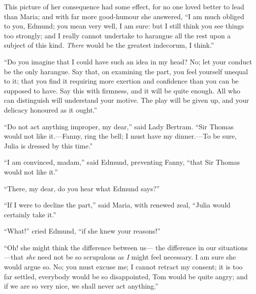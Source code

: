 This picture of her consequence had some effect, for no
one loved better to lead than Maria; and with far more
good-humour she answered, ``I am much obliged to you, Edmund;
you mean very well, I am sure:  but I still think you
see things too strongly; and I really cannot undertake
to harangue all the rest upon a subject of this kind.
\emph{There} would be the greatest indecorum, I think.''

``Do you imagine that I could have such an idea in
my head?  No; let your conduct be the only harangue.
Say that, on examining the part, you feel yourself
unequal to it; that you find it requiring more exertion
and confidence than you can be supposed to have.
Say this with firmness, and it will be quite enough.
All who can distinguish will understand your motive.
The play will be given up, and your delicacy honoured as
it ought.''

``Do not act anything improper, my dear,'' said Lady Bertram.
``Sir Thomas would not like it.---Fanny, ring the bell;
I must have my dinner.---To be sure, Julia is dressed by
this time.''

``I am convinced, madam,'' said Edmund, preventing Fanny,
``that Sir Thomas would not like it.''

``There, my dear, do you hear what Edmund says?''

``If I were to decline the part,'' said Maria,
with renewed zeal, ``Julia would certainly take it.''

``What!'' cried Edmund, ``if she knew your reasons!''

``Oh! she might think the difference between us---%
the difference in our situations---that \emph{she} need
not be so scrupulous as \emph{I} might feel necessary.
I am sure she would argue so.  No; you must excuse me;
I cannot retract my consent; it is too far settled,
everybody would be so disappointed, Tom would be quite angry;
and if we are so very nice, we shall never act anything.''

